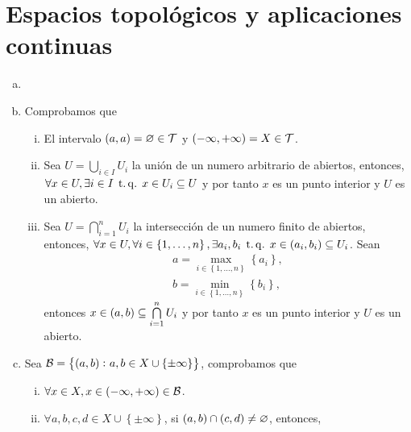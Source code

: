 \chapter{Espacios topológicos y aplicaciones continuas}

\begin{eje}
    \begin{enumerate}[(a)]
        \item[]
        \item Comprobamos que
            \begin{enumerate}[i)]
                \item El intervalo $\left( a, a \right) = \varnothing \in \mathcal{T}$ y $\left( -\infty, +\infty \right) = X \in \mathcal{T}$.
                \item Sea $U = \bigcup\limits_{i \in I} U_i$ la unión de un numero arbitrario de abiertos, entonces, $\forall x \in U, \exists i \in I \operatorname{\;t.q.\;} x \in U_i \subseteq U$ y por tanto $x$ es un punto interior y $U$ es un abierto.
                \item Sea $U = \bigcap\limits_{i = 1}^n U_i$ la intersección de un numero finito de abiertos, entonces, $\forall x \in U, \forall i \in \left\{ 1, \dots, n \right\}, \exists a_i, b_i \operatorname{\;t.q.\;} x \in \left(a_i, b_i\right) \subseteq U_i$. Sean
                    \begin{gather*}
                        a = \max_{i \in \left\{ 1, \dots, n \right\}} \left\{a_i\right\}, \\
                        b = \min_{i \in \left\{ 1, \dots, n \right\}} \left\{b_i\right\},
                    \end{gather*}
                entonces $x \in \left( a, b \right) \subseteq \bigcap\limits_{i = 1}^n U_i$ y por tanto $x$ es un punto interior y $U$ es un abierto.
            \end{enumerate}
        \item Sea $\mathcal{B} = \left\{ \left( a, b \right) \colon a, b \in X \cup \left\{ \pm \infty \right\} \right\}$, comprobamos que
            \begin{enumerate}[i)]
                \item $\forall x \in X, x \in \left( -\infty, +\infty \right) \in \mathcal{B}$.
                \item $\forall a, b, c, d \in X \cup \left\{ \pm \infty \right\}$, si $\left( a, b \right) \cap \left( c, d \right) \neq \varnothing$, entonces,

\end{enumerate}
\end{enumerate}
\end{eje}
